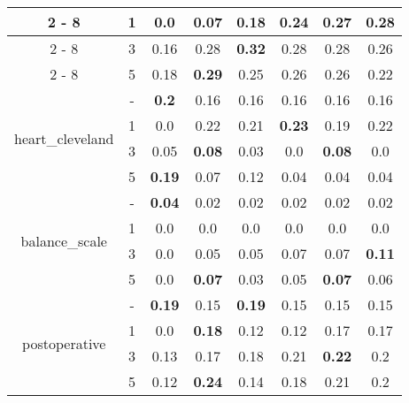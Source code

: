 \documentclass{article}%
\begin{document}
\begin{longtable}{c|c|cccccc}
\cline{2%
-%
8}%
&1&0.0&0.07&0.18&0.24&0.27&\textbf{0.28}\\%
\cline{2%
-%
8}%
&3&0.16&0.28&\textbf{0.32}&0.28&0.28&0.26\\%
\cline{2%
-%
8}%
&5&0.18&\textbf{0.29}&0.25&0.26&0.26&0.22\\%
\hline%
\multirow{4}{*}{heart\_cleveland}&{-}&\textbf{0.2}&0.16&0.16&0.16&0.16&0.16\\%
\cline{2%
-%
8}%
&1&0.0&0.22&0.21&\textbf{0.23}&0.19&0.22\\%
\cline{2%
-%
8}%
&3&0.05&\textbf{0.08}&0.03&0.0&\textbf{0.08}&0.0\\%
\cline{2%
-%
8}%
&5&\textbf{0.19}&0.07&0.12&0.04&0.04&0.04\\%
\hline%
\multirow{4}{*}{balance\_scale}&{-}&\textbf{0.04}&0.02&0.02&0.02&0.02&0.02\\%
\cline{2%
-%
8}%
&1&0.0&0.0&0.0&0.0&0.0&0.0\\%
\cline{2%
-%
8}%
&3&0.0&0.05&0.05&0.07&0.07&\textbf{0.11}\\%
\cline{2%
-%
8}%
&5&0.0&\textbf{0.07}&0.03&0.05&\textbf{0.07}&0.06\\%
\hline%
\multirow{4}{*}{postoperative}&{-}&\textbf{0.19}&0.15&\textbf{0.19}&0.15&0.15&0.15\\%
\cline{2%
-%
8}%
&1&0.0&\textbf{0.18}&0.12&0.12&0.17&0.17\\%
\cline{2%
-%
8}%
&3&0.13&0.17&0.18&0.21&\textbf{0.22}&0.2\\%
\cline{2%
-%
8}%
&5&0.12&\textbf{0.24}&0.14&0.18&0.21&0.2\\%
\hline%
\end{longtable}

%
\end{document}
